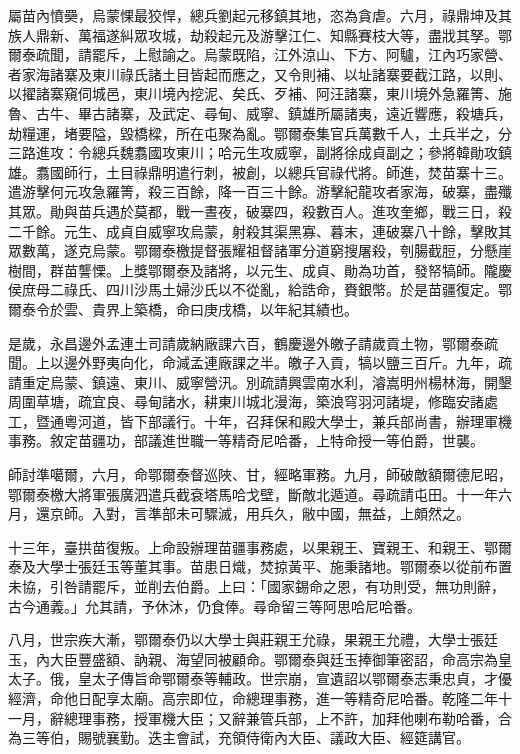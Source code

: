 \begin{pinyinscope}
屬苗內憤奰，烏蒙惈最狡悍，總兵劉起元移鎮其地，恣為貪虐。六月，祿鼎坤及其族人鼎新、萬福遂糾眾攻城，劫殺起元及游擊江仁、知縣賽枝大等，盡戕其孥。鄂爾泰疏聞，請罷斥，上慰諭之。烏蒙既陷，江外涼山、下方、阿驢，江內巧家營、者家海諸寨及東川祿氏諸土目皆起而應之，又令則補、以址諸寨要截江路，以則、以擢諸寨窺伺城邑，東川境內挖泥、矣氏、歹補、阿汪諸寨，東川境外急羅箐、施魯、古牛、畢古諸寨，及武定、尋甸、威寧、鎮雄所屬諸夷，遠近響應，殺塘兵，劫糧運，堵要隘，毀橋樑，所在屯聚為亂。鄂爾泰集官兵萬數千人，土兵半之，分三路進攻：令總兵魏翥國攻東川；哈元生攻威寧，副將徐成貞副之；參將韓勛攻鎮雄。翥國師行，土目祿鼎明遣行刺，被創，以總兵官祿代將。師進，焚苗寨十三。遣游擊何元攻急羅箐，殺三百餘，降一百三十餘。游擊紀龍攻者家海，破寨，盡殲其眾。勛與苗兵遇於莫都，戰一晝夜，破寨四，殺數百人。進攻奎鄉，戰三日，殺二千餘。元生、成貞自威寧攻烏蒙，射殺其渠黑寡、暮末，連破寨八十餘，擊敗其眾數萬，遂克烏蒙。鄂爾泰檄提督張耀祖督諸軍分道窮搜屠殺，刳腸截脰，分懸崖樹間，群苗讋慄。上獎鄂爾泰及諸將，以元生、成貞、勛為功首，發帑犒師。隴慶侯庶母二祿氏、四川沙馬土婦沙氏以不從亂，給誥命，賚銀幣。於是苗疆復定。鄂爾泰令於雲、貴界上築橋，命曰庚戌橋，以年紀其績也。

是歲，永昌邊外孟連土司請歲納廠課六百，鶴慶邊外皦子請歲貢土物，鄂爾泰疏聞。上以邊外野夷向化，命減孟連廠課之半。皦子入貢，犒以鹽三百斤。九年，疏請重定烏蒙、鎮遠、東川、威寧營汛。別疏請興雲南水利，濬嵩明州楊林海，開墾周圍草塘，疏宜良、尋甸諸水，耕東川城北漫海，築浪穹羽河諸堤，修臨安諸處工，暨通粵河道，皆下部議行。十年，召拜保和殿大學士，兼兵部尚書，辦理軍機事務。敘定苗疆功，部議進世職一等精奇尼哈番，上特命授一等伯爵，世襲。

師討準噶爾，六月，命鄂爾泰督巡陜、甘，經略軍務。九月，師破敵額爾德尼昭，鄂爾泰檄大將軍張廣泗遣兵截袞塔馬哈戈壁，斷敵北遁道。尋疏請屯田。十一年六月，還京師。入對，言準部未可驟滅，用兵久，敝中國，無益，上頗然之。

十三年，臺拱苗復叛。上命設辦理苗疆事務處，以果親王、寶親王、和親王、鄂爾泰及大學士張廷玉等董其事。苗患日熾，焚掠黃平、施秉諸地。鄂爾泰以從前布置未協，引咎請罷斥，並削去伯爵。上曰：「國家錫命之恩，有功則受，無功則辭，古今通義。」允其請，予休沐，仍食俸。尋命留三等阿思哈尼哈番。

八月，世宗疾大漸，鄂爾泰仍以大學士與莊親王允祿，果親王允禮，大學士張廷玉，內大臣豐盛額、訥親、海望同被顧命。鄂爾泰與廷玉捧御筆密詔，命高宗為皇太子。俄，皇太子傳旨命鄂爾泰等輔政。世宗崩，宣遺詔以鄂爾泰志秉忠貞，才優經濟，命他日配享太廟。高宗即位，命總理事務，進一等精奇尼哈番。乾隆二年十一月，辭總理事務，授軍機大臣；又辭兼管兵部，上不許，加拜他喇布勒哈番，合為三等伯，賜號襄勤。迭主會試，充領侍衛內大臣、議政大臣、經筵講官。


\end{pinyinscope}
